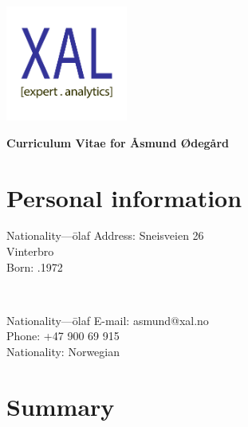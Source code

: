 \documentclass[english,a4paper,11pt]{article}
\begin{document}
\vspace*{-3cm}
\hspace*{12.5cm}\includegraphics[width=4cm]{logo.pdf}
\vspace*{-1.65cm}

\noindent
{\LARGE \bfseries \color{xaldark}Curriculum Vitae for Åsmund Ødegård}

\section*{Personal information}

\begin{minipage}[t]{0.4\textwidth}
\begin{tabbing}Nationality---\=olaf\kill 
Address: \> Sneisveien 26 \\
 Vinterbro \\
Born: .1972 \\
\end{tabbing}
\end{minipage}
$\quad\quad$
\begin{minipage}[t]{0.3\textwidth}
\begin{tabbing}Nationality---\=olaf\kill 
E-mail: \>asmund@xal.no \\
Phone: \>+47 900 69 915 \\
Nationality: \>Norwegian\\
\end{tabbing}
\end{minipage}


\section*{Summary}
\end{document}
